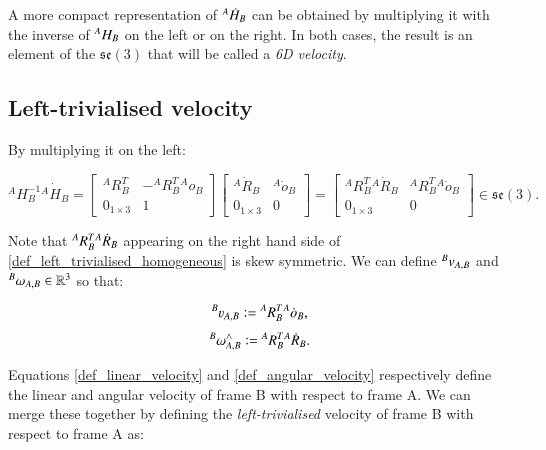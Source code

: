 A more compact representation of ${}^{A}{\dot{H}}_{B}$ can be obtained by multiplying it with the inverse of ${}^{A}{H}_{B}$ on the left or on the right. In both cases, the result is an element of the $\mathfrak{se}(3)$ that will be called a \textit{6D velocity}.

\subsection{Left-trivialised velocity}

By multiplying it on the left:

\begin{equation} \label{def_left_trivialised_homogeneous}
    {}^A H_B^{-1} \dot{{}^A H_B} =
    \begin{bmatrix}
    {}^A R_B^T & -{}^A R_B^T {}^A o_B \\
    0_{1\times3} & 1
    \end{bmatrix}
    \begin{bmatrix}
    {}^A \dot{R}_B & {}^A \dot{o}_B \\
    0_{1\times3} & 0
    \end{bmatrix}
    =
    \begin{bmatrix}
    {}^A R_B^T {}^A \dot{R}_B & {}^A R_B^T {}^A \dot{o}_B \\
    0_{1\times3} & 0
    \end{bmatrix} \in \mathfrak{se}(3).
\end{equation}

Note that ${}^{A}{R}_{B}^{T} {}^{A}{\dot{R}}_{B}$ appearing on the right hand side of \ref{def_left_trivialised_homogeneous} is skew symmetric. We can define ${}^{B}{v}_{A,B}$ and ${}^{B}{\omega}_{A,B} \in \mathbb{R}^3$ so that:

\begin{equation}\label{def_linear_velocity}
    \leftsuperscript{B}{\varv}{A,B} \defeq \leftsuperscript{A}{R}{B}^{T} \leftsuperscript{A}{\dot{o}}{B},
\end{equation}
\begin{equation}\label{def_angular_velocity}
    {}^{B}{\omega}_{A,B}^{\wedge} \vcentcolon= {}^{A}{R}_{B}^{T} {}^{A}{\dot{R}}_{B}.
\end{equation}

Equations \ref{def_linear_velocity} and \ref{def_angular_velocity} respectively define the linear and angular velocity of frame B with respect to frame A.
We can merge these together by defining the \textit{left-trivialised} velocity of frame B with respect to frame A as:

